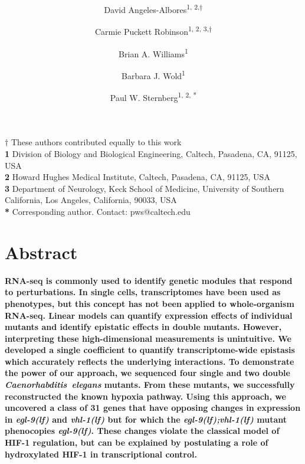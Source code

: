 \documentclass[10pt, onecolumn]{article}
\title{
  \Large
  \textbf{\titleone}
}
\author{David Angeles-Albores\textsuperscript{1, 2,$\dagger{}$}
\and{}
Carmie Puckett Robinson\textsuperscript{1, 2, 3,$\dagger{}$}
\and{}
Brian A. Williams\textsuperscript{1}
\and{}
Barbara J. Wold\textsuperscript{1}
\and{}
Paul W. Sternberg\textsuperscript{1, 2, *}
}
\newcommand{\egl}{\emph{\mbox{egl-9}(lf)}}
\newcommand{\vhl}{\emph{\mbox{vhl-1}(lf)}}
\newcommand{\eglvhl}{\emph{\mbox{egl-9(lf);vhl-1(lf)}}}
\begin{document}
\sloppy{}
\linenumbers{}


\maketitle
\textbf{$\dagger$} These authors contributed equally to this work\\
\textbf{1} Division of Biology and Biological Engineering, Caltech,
Pasadena, CA, 91125, USA\\
\textbf{2} Howard Hughes Medical Institute, Caltech, Pasadena, CA, 91125, USA\\
\textbf{3} Department of Neurology, Keck School of Medicine, University of
Southern California, Los Angeles, California, 90033, USA\\
\textbf{*} Corresponding author. Contact: pws@caltech.edu

\section*{Abstract}
\textbf{RNA-seq is commonly used to identify genetic modules that respond to perturbations.
In single cells, transcriptomes have been used as phenotypes, but this concept
has not been applied to whole-organism RNA-seq. Linear models can quantify
expression effects of individual mutants and identify epistatic effects in double
mutants. However, interpreting these high-dimensional measurements is unintuitive.
We developed a single coefficient to quantify transcriptome-wide epistasis which
accurately reflects the underlying interactions. To demonstrate the power of our
approach, we sequenced four single and two double \emph{Caenorhabditis~elegans}
mutants. From these mutants, we successfully reconstructed the known hypoxia
pathway. Using this approach, we uncovered a class of 31 genes that have opposing
changes in expression in \egl{} and \vhl{} but for which the \eglvhl{} mutant
phenocopies \egl{}. These changes violate the classical model of HIF-1
regulation, but can be explained by postulating a role of hydroxylated HIF-1 in
transcriptional control.
}
\vspace{10mm}



\end{document}
